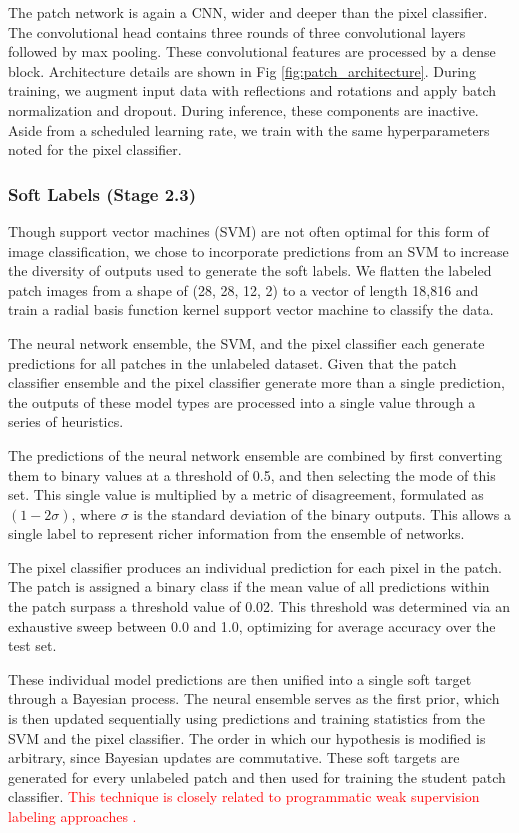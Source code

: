 \documentclass[10pt,letterpaper]{article}
\begin{document}
The patch network is again a CNN, wider and deeper than the pixel classifier. The convolutional head contains three rounds of three convolutional layers followed by max pooling. These convolutional features are processed by a dense block. Architecture details are shown in Fig \ref{fig:patch_architecture}. During training, we augment input data with reflections and rotations and apply batch normalization and dropout. During inference, these components are inactive. Aside from a scheduled learning rate, we train with the same hyperparameters noted for the pixel classifier.

\subsubsection*{Soft Labels (Stage 2.3)}
Though support vector machines (SVM) are not often optimal for this form of image classification, we chose to incorporate predictions from an SVM to increase the diversity of outputs used to generate the soft labels. We flatten the labeled patch images from a shape of (28, 28, 12, 2) to a vector of length 18,816 and train a radial basis function kernel support vector machine to classify the data.

The neural network ensemble, the SVM, and the pixel classifier each generate predictions for all patches in the unlabeled dataset. Given that the patch classifier ensemble and the pixel classifier generate more than a single prediction, the outputs of these model types are processed into a single value through a series of heuristics.

The predictions of the neural network ensemble are combined by first converting them to binary values at a threshold of 0.5, and then selecting the mode of this set. This single value is multiplied by a metric of disagreement, formulated as $(1 - 2\sigma)$, where $\sigma$ is the standard deviation of the binary outputs. This allows a single label to represent richer information from the ensemble of networks.

The pixel classifier produces an individual prediction for each pixel in the patch. The patch is assigned a binary class if the mean value of all predictions within the patch surpass a threshold value of 0.02. This threshold was determined via an exhaustive sweep between 0.0 and 1.0, optimizing for average accuracy over the test set.

These individual model predictions are then unified into a single soft target through a Bayesian process. The neural ensemble serves as the first prior, which is then updated sequentially using predictions and training statistics from the SVM and the pixel classifier. The order in which our hypothesis is modified is arbitrary, since Bayesian updates are commutative. These soft targets are generated for every unlabeled patch and then used for training the student patch classifier. \textcolor{red}{This technique is closely related to programmatic weak supervision labeling approaches \cite{https://doi.org/10.48550/arxiv.2202.05433}.}
\end{document}
